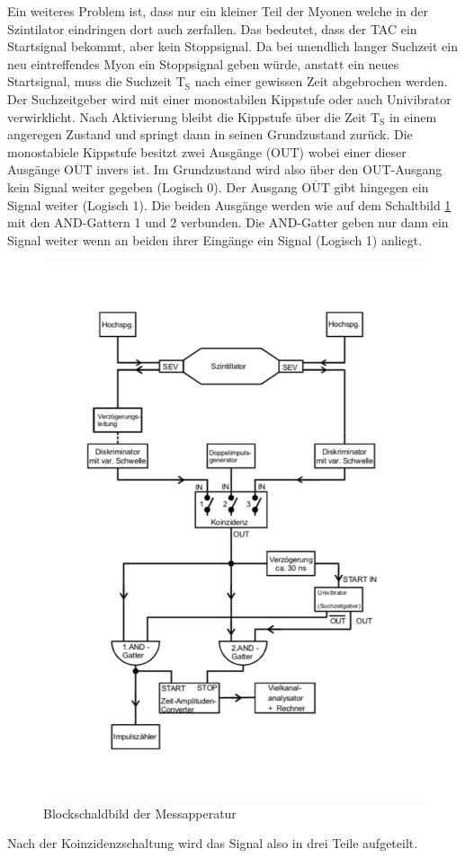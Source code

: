 Ein weiteres Problem ist, dass nur ein kleiner Teil der Myonen welche in der Szintilator eindringen dort auch zerfallen.
Das bedeutet, dass der TAC ein Startsignal bekommt, aber kein Stoppsignal.
Da bei unendlich langer Suchzeit ein neu eintreffendes Myon ein Stoppsignal geben würde, anstatt ein neues Startsignal,
muss die Suchzeit $\text{T}_{\text{S}}$ nach einer gewissen Zeit abgebrochen werden.
Der Suchzeitgeber wird mit einer monostabilen Kippstufe oder auch Univibrator verwirklicht.
Nach Aktivierung bleibt die Kippstufe über die Zeit $\text{T}_{\text{S}}$ in einem angeregen Zustand und springt dann in seinen Grundzustand zurück.
Die monostabiele Kippstufe besitzt zwei Ausgänge (OUT) wobei einer dieser Ausgänge $\overline{\text{OUT}}$ invers ist.
Im Grundzustand wird also über den OUT-Ausgang kein Signal weiter gegeben (Logisch 0).
Der Ausgang $\overline{\text{OUT}}$ gibt hingegen ein Signal weiter (Logisch 1).
Die beiden Ausgänge werden wie auf dem Schaltbild \ref{fig:block} mit den AND-Gattern 1 und 2 verbunden.
Die AND-Gatter geben nur dann ein Signal weiter wenn an beiden ihrer Eingänge ein Signal (Logisch 1) anliegt.

\begin{figure}[h!]
  \centering
  \includegraphics[width=0.6 \textwidth]{schaltung.pdf}
  \caption{Blockschaldbild der Messapperatur \cite{1}}
  \label{fig:block}
\end{figure}
\FloatBarrier

Nach der Koinzidenzschaltung wird das Signal also in drei Teile aufgeteilt.

